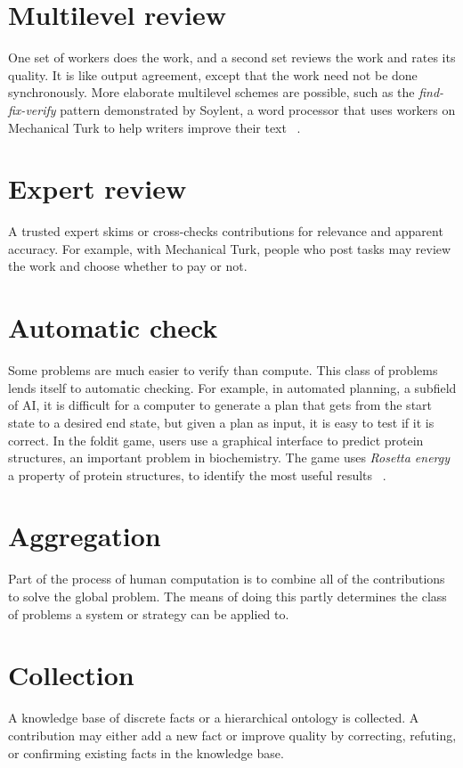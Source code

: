 \documentclass{acm_proc_article-sp}
\begin{document}
\section*{Multilevel review}
One set of workers does the work, and a second set reviews the work and rates its quality. It is like output agreement, except that the work need not be done synchronously. More elaborate multilevel schemes are possible, such as the \textit{find-fix-verify} pattern demonstrated by Soylent, a word processor that uses workers on Mechanical Turk to help writers improve their text ~\cite{bernstein2015}.
\section*{Expert review}
A trusted expert skims or cross-checks contributions for relevance and apparent accuracy. For example, with Mechanical Turk, people who post tasks may review the work and choose whether to pay or not.
\section*{Automatic check}
Some problems are much easier to verify than compute. This class of problems lends itself to automatic checking. For example, in automated planning, a subfield of AI, it is difficult for a computer to generate a plan that gets from the start state to a desired end state, but given a plan as input, it is easy to test if it is correct. In the foldit game, users use a graphical interface to predict protein structures, an important problem in biochemistry. The game uses \textit{Rosetta energy} a property of protein structures, to identify the most useful results ~\cite{cooper2010}.
\section*{Aggregation}
Part of the process of human computation is to combine all of the contributions to solve the global problem. The means of doing this partly determines the class of problems a system or strategy can be applied to.
\section*{Collection}
A knowledge base of discrete facts or a hierarchical ontology is collected. A contribution may either add a new fact or improve quality by correcting, refuting, or confirming existing facts in the knowledge base.
\end{document}
